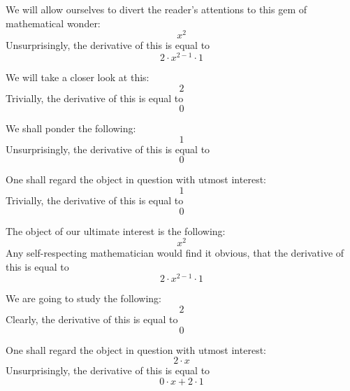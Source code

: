 \documentclass{article}
\begin{document}
We will allow ourselves to divert the reader's attentions to this gem of mathematical wonder:
\begin{equation}
x ^{2 } 
\end{equation}
Unsurprisingly, the derivative of this is equal to
\begin{equation}
2 \cdot x ^{2 - 1 } \cdot 1 
\end{equation}

We will take a closer look at this:
\begin{equation}
2 
\end{equation}
Trivially, the derivative of this is equal to
\begin{equation}
0 
\end{equation}

We shall ponder the following:
\begin{equation}
1 
\end{equation}
Unsurprisingly, the derivative of this is equal to
\begin{equation}
0 
\end{equation}

One shall regard the object in question with utmost interest:
\begin{equation}
1 
\end{equation}
Trivially, the derivative of this is equal to
\begin{equation}
0 
\end{equation}

The object of our ultimate interest is the following:
\begin{equation}
x ^{2 } 
\end{equation}
Any self-respecting mathematician would find it obvious, that the derivative of this is equal to
\begin{equation}
2 \cdot x ^{2 - 1 } \cdot 1 
\end{equation}

We are going to study the following:
\begin{equation}
2 
\end{equation}
Clearly, the derivative of this is equal to
\begin{equation}
0 
\end{equation}

One shall regard the object in question with utmost interest:
\begin{equation}
2 \cdot x 
\end{equation}
Unsurprisingly, the derivative of this is equal to
\begin{equation}
0 \cdot x + 2 \cdot 1 
\end{equation}
\end{document}
